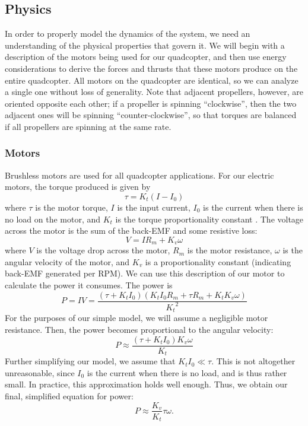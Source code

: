 \documentclass{article}
\begin{document}
\subsection*{Physics}
In order to properly model the dynamics of the system, we need an understanding of the physical
properties that govern it. We will begin with a description of the motors being used for our
quadcopter, and then use energy considerations to derive the forces and thrusts that these motors
produce on the entire quadcopter. All motors on the quadcopter are identical, so we can analyze a
single one without loss of generality. Note that adjacent propellers, however, are oriented opposite
each other; if a propeller is spinning ``clockwise'', then the two adjacent ones will be spinning
``counter-clockwise'', so that torques are balanced if all propellers are spinning at the same rate.
\subsubsection*{Motors}
Brushless motors are used for all quadcopter applications. For our electric motors, the torque
produced is given by
\[\tau = K_t (I - I_0)\]
where $\tau$ is the motor torque, $I$ is the input current, $I_0$ is the current when there is no
load on the motor, and $K_t$ is the torque proportionality constant \cite{brushless}. The voltage across the motor is
the sum of the back-EMF and some resistive loss:
\[V = I R_m  + K_v \omega\]
where $V$ is the voltage drop across the motor, $R_m$ is the motor resistance, $\omega$ is the
angular velocity of the motor, and $K_v$ is a proportionality constant (indicating back-EMF
generated per RPM).
We can use this description of our motor to calculate the power it consumes. The power is
\[P = IV = \frac{(\tau + K_t I_0) (K_t I_0 R_m + \tau R_m + K_t K_v \omega)}{ {K_t}^2}\]
For the purposes of our simple model, we will assume a negligible motor resistance. Then, the power
becomes proportional to the angular velocity:
\[P \approx \frac{(\tau + K_t I_0)  K_v \omega}{ {K_t}}\]
Further simplifying our model, we assume that $K_t I_0 \ll \tau$. This is not altogether unreasonable,
since $I_0$ is the current when there is no load, and is thus rather small. In practice, this
approximation holds well enough. Thus, we obtain our final, simplified equation for power:
\[P \approx \frac{K_v}{K_t} \tau \omega.\]
\end{document}
